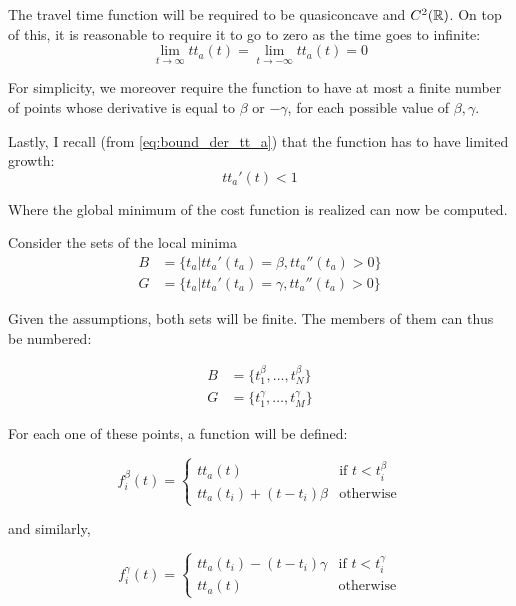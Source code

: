 The travel time function will be required to be quasiconcave and \(C^2(\mathbb{R})\).
On top of this, it is reasonable to require it to go to zero as the time goes to infinite:
\begin{equation*}
  \lim_{t \rightarrow \infty} tt_a(t) = \lim_{t \rightarrow -\infty}tt_a(t) = 0
\end{equation*}

For simplicity, we moreover require the function to have at most a finite number of points whose derivative is equal to \(\beta\) or \(-\gamma\), for each possible value of \(\beta, \gamma\).

Lastly, I recall (from \eqref{eq:bound_der_tt_a}) that the function has to have limited growth:
\[tt_a'(t) < 1\]

Where the global minimum of the cost function is realized can now be computed.

Consider the sets of the local minima
\begin{align*}
  B & = \{t_a | tt_a'(t_a) = \beta, tt_a''(t_a) > 0\} \\
  G & = \{t_a | tt_a'(t_a) = \gamma, tt_a''(t_a) > 0\}
\end{align*}

Given the assumptions, both sets will be finite.
The members of them can thus be numbered:

\begin{align*}
  B & = \{t^\beta_1, \dots, t^\beta_N\} \\
  G & = \{t^\gamma_1, \dots, t^\gamma_M\}
\end{align*}

For each one of these points, a function will be defined:

\begin{equation*}
  f_i^\beta(t) =
  \begin{cases}
    tt_a(t) & \text{if } t < t_i^\beta \\
    tt_a(t_i) + (t - t_i)\beta & \text{otherwise}
  \end{cases}
\end{equation*}

and similarly,

\begin{equation*}
  f_i^\gamma(t) =
  \begin{cases}
    tt_a(t_i) - (t - t_i)\gamma & \text{if } t < t_i^\gamma \\
    tt_a(t) & \text{otherwise}
  \end{cases}
\end{equation*}

